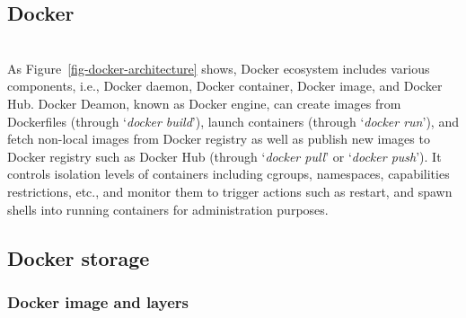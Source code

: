 \subsection{Docker}

\\


As Figure~\ref{fig-docker-architecture} shows, Docker ecosystem includes various components, i.e., Docker daemon, Docker container, Docker image, and Docker Hub.
%
Docker Deamon, known as Docker engine, can create images from Dockerfiles (through `\textit{docker build}'), launch containers (through `\textit{docker run}'), and fetch non-local images from Docker registry as well as publish new images to Docker registry such as Docker Hub (through `\textit{docker pull}' or `\textit{docker push}').
%
It controls isolation levels of containers including cgroups, namespaces, capabilities restrictions, etc., and monitor them to trigger actions such as restart, and spawn shells into running containers for administration purposes.
%





\subsection{Docker storage}

\subsubsection{Docker image and layers}

